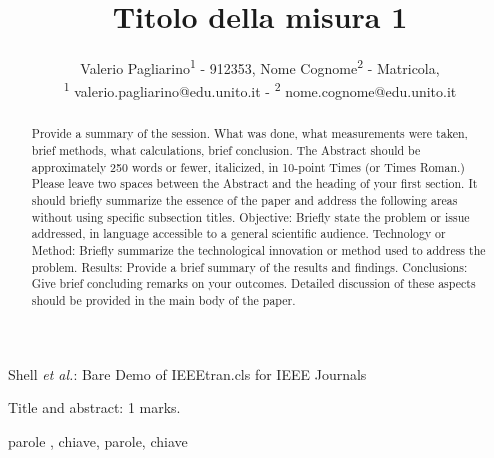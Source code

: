 \documentclass[journal]{IEEEtran}
\begin{document}
\title{Titolo della misura 1\\ 
}

\author{Valerio Pagliarino\textsuperscript{1}
        - 912353,
        Nome Cognome\textsuperscript{2}
        - Matricola,
        {\small\\
        \textsuperscript{1}
        valerio.pagliarino@edu.unito.it  -
        \textsuperscript{2}
        nome.cognome@edu.unito.it
        }}%
        
{Shell \MakeLowercase{\textit{et al.}}: Bare Demo of IEEEtran.cls for IEEE Journals}

\maketitle

\begin{flushright} Title and abstract: 1 marks. \end{flushright}
\begin{abstract} Provide a summary of the session. What was done, 
what measurements were taken, brief methods, what calculations, brief conclusion.  The Abstract should be approximately 250 words or fewer, italicized, in 10-point Times (or Times Roman.) Please leave two spaces between the Abstract and the heading of your first section.
It should briefly summarize the essence of the paper and address the following areas without using specific subsection titles. Objective: Briefly state the problem or issue addressed, in language accessible to a general scientific audience. Technology or Method: Briefly summarize the technological innovation or method used to address the problem. Results: Provide a brief summary of the results and findings. Conclusions: Give brief concluding remarks on your outcomes. Detailed discussion of these aspects should be provided in the main body of the paper. 
\end{abstract}

\begin{IEEEkeywords}
parole , chiave, parole, chiave
\end{IEEEkeywords}
\end{document}
